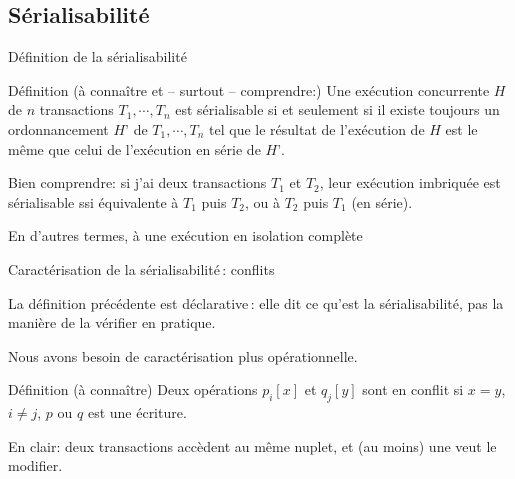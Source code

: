 
\subsection{Sérialisabilité}


\begin{frame}{Définition de la sérialisabilité}


\begin{defblock}{Définition (à connaître et -- surtout -- comprendre:)}
Une exécution concurrente $H$ de $n$ transactions $T_1, \cdots, T_n$
est \alert{sérialisable} si et seulement si
il existe toujours un ordonnancement $H’$ de $T_1, \cdots, T_n$ tel que le résultat 
de l’exécution de $H$ est le même que celui de l'exécution \alert{en série} de $H’$.
\end{defblock}

\vfill

\begin{blocgauche}
Bien comprendre: si j'ai deux transactions $T_1$ et $T_2$, leur exécution imbriquée
est sérialisable ssi équivalente à $T_1$ puis $T_2$, ou à $T_2$ puis $T_1$ (\alert{en série}).

\medskip

En d'autres termes, à une exécution \alert{en isolation complète}
\end{blocgauche}

\end{frame}


\begin{frame}{Caractérisation de la sérialisabilité\,: conflits}

La définition précédente est \alert{déclarative}\,: elle dit ce qu'est la sérialisabilité,
pas la manière de la vérifier en pratique.

\medskip

Nous avons besoin de caractérisation plus opérationnelle.
\vfill

\begin{defblock}{Définition (à connaître)}
Deux opérations  $p_i[x]$ et $q_j[y]$ sont 
\alert{en conflit} si $x=y$, $i \not= j$,  $p$ ou 
$q$ est une écriture.
\end{defblock}

\vfill
\begin{blocgauche}
En clair: deux transactions accèdent au même nuplet, et (au moins) une veut le modifier.
\end{blocgauche}

\end{frame}

